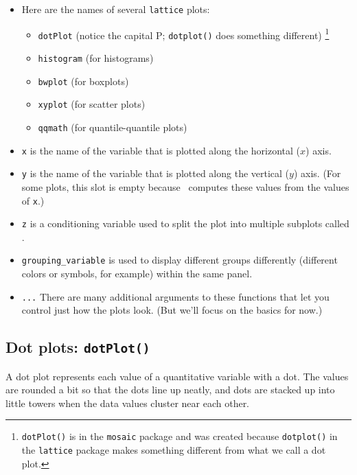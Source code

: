 \begin{itemize}
\item
Here are the names of several \verb!lattice! plots:
\begin{itemize}
\item \verb!dotPlot! (notice the capital P; \verb!dotplot()! does something different)
\footnote{\texttt{dotPlot()} is in the \texttt{mosaic} package and was created because \texttt{dotplot()} in
the \texttt{lattice} package makes something different from what we call a dot plot.}
\item \verb!histogram!  (for histograms)
\item \verb!bwplot!  (for boxplots)
\item \verb!xyplot!  (for scatter plots)
\item \verb!qqmath!  (for quantile-quantile plots)
\end{itemize}
\item
\verb!x! is the name of the variable that is plotted along the horizontal 
($x$) axis.
\item
\verb!y! is the name of the variable that is plotted along the vertical ($y$) 
axis.  (For some plots, this slot is empty because \R\ computes these values
from the values of \verb!x!.)
\item
\verb!z! is a conditioning variable used to split the plot into 
multiple subplots called .
\item
\verb!grouping_variable! is used to display different groups differently
(different colors or symbols, for example) within the same panel.
\item
\verb!...! There are many additional arguments to these functions that let you
control just how the plots look.  (But we'll focus on the basics for now.)
\end{itemize}


\subsection{Dot plots: \texttt{dotPlot()}}

A dot plot represents each value of a quantitative variable with a dot.  The values
are rounded a bit so that the dots line up neatly, and dots are stacked up into little
towers when the data values cluster near each other.


